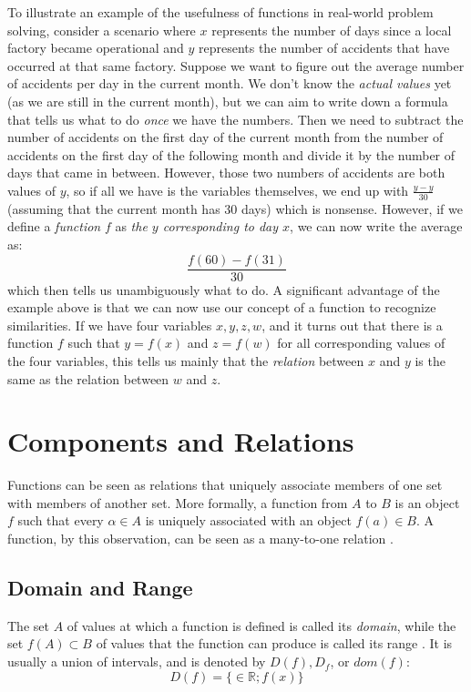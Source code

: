 \documentclass[11pt,oneside]{book}              %
\begin{document}
To illustrate an example of the usefulness of functions in real-world problem solving, consider a scenario where $x$ represents the number of days since a local factory became operational and $y$ represents the number of accidents that have occurred at that same factory. Suppose we want to figure out the average number of accidents per day in the current month. We don't know the \textit{actual values} yet (as we are still in the current month), but we can aim to write down a formula that tells us what to do \textit{once} we have the numbers. Then we need to subtract the number of accidents on the first day of the current month from the number of accidents on the first day of the following month and divide it by the number of days that came in between. However, those two numbers of accidents are both values of $y$, so if all we have is the variables themselves, we end up with $\frac{y - y}{30}$ (assuming that the current month has $30$ days) which is nonsense. However, if we define a \textit{function} $f$ as \textit{the $y$ corresponding to day $x$}, we can now write the average as:
\begin{equation*}
	\frac{f(60) - f(31)}{30}
\end{equation*}
which then tells us unambiguously what to do. A significant advantage of the example above is that we can now use our concept of a function to recognize similarities. If we have four variables $x, y, z, w$, and it turns out that there is a function $f$ such that $y = f(x)$ and $z = f(w)$ for all corresponding values of the four variables, this tells us mainly that the \textit{relation} between $x$ and $y$ is the same as the relation between $w$ and $z$.

\section{Components and Relations}
Functions can be seen as relations that uniquely associate members of one set with members of another set. More formally, a function from $A$ to $B$ is an object $f$ such that every $\alpha \in A$ is uniquely associated with an object $f(a) \in B$. A function, by this observation, can be seen as a many-to-one relation \cite{wolfram2}.

\subsection{Domain and Range}
The set $A$ of values at which a function is defined is called its \textit{domain}, while the set $f(A) \subset B$ of values that the function can produce is called its range \cite{wolfram2}. It is usually a union of intervals, and is denoted by $D(f), D_f$, or $dom(f)$:
\begin{equation*}
	D(f) = \lbrace \in \mathbb{R}; f(x) \rbrace
\end{equation*}
\end{document}
